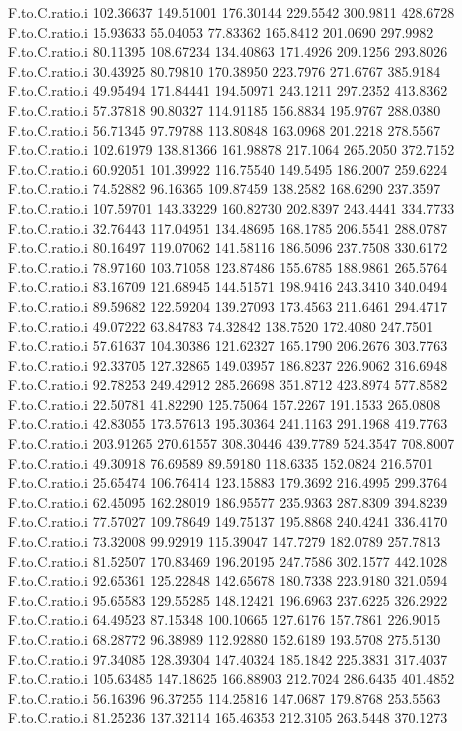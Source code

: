 \documentclass[11pt]{article} %
\begin{document}
\begin{Schunk}
\begin{Soutput}
F.to.C.ratio.i 102.36637 149.51001 176.30144 229.5542 300.9811 428.6728
F.to.C.ratio.i  15.93633  55.04053  77.83362 165.8412 201.0690 297.9982
F.to.C.ratio.i  80.11395 108.67234 134.40863 171.4926 209.1256 293.8026
F.to.C.ratio.i  30.43925  80.79810 170.38950 223.7976 271.6767 385.9184
F.to.C.ratio.i  49.95494 171.84441 194.50971 243.1211 297.2352 413.8362
F.to.C.ratio.i  57.37818  90.80327 114.91185 156.8834 195.9767 288.0380
F.to.C.ratio.i  56.71345  97.79788 113.80848 163.0968 201.2218 278.5567
F.to.C.ratio.i 102.61979 138.81366 161.98878 217.1064 265.2050 372.7152
F.to.C.ratio.i  60.92051 101.39922 116.75540 149.5495 186.2007 259.6224
F.to.C.ratio.i  74.52882  96.16365 109.87459 138.2582 168.6290 237.3597
F.to.C.ratio.i 107.59701 143.33229 160.82730 202.8397 243.4441 334.7733
F.to.C.ratio.i  32.76443 117.04951 134.48695 168.1785 206.5541 288.0787
F.to.C.ratio.i  80.16497 119.07062 141.58116 186.5096 237.7508 330.6172
F.to.C.ratio.i  78.97160 103.71058 123.87486 155.6785 188.9861 265.5764
F.to.C.ratio.i  83.16709 121.68945 144.51571 198.9416 243.3410 340.0494
F.to.C.ratio.i  89.59682 122.59204 139.27093 173.4563 211.6461 294.4717
F.to.C.ratio.i  49.07222  63.84783  74.32842 138.7520 172.4080 247.7501
F.to.C.ratio.i  57.61637 104.30386 121.62327 165.1790 206.2676 303.7763
F.to.C.ratio.i  92.33705 127.32865 149.03957 186.8237 226.9062 316.6948
F.to.C.ratio.i  92.78253 249.42912 285.26698 351.8712 423.8974 577.8582
F.to.C.ratio.i  22.50781  41.82290 125.75064 157.2267 191.1533 265.0808
F.to.C.ratio.i  42.83055 173.57613 195.30364 241.1163 291.1968 419.7763
F.to.C.ratio.i 203.91265 270.61557 308.30446 439.7789 524.3547 708.8007
F.to.C.ratio.i  49.30918  76.69589  89.59180 118.6335 152.0824 216.5701
F.to.C.ratio.i  25.65474 106.76414 123.15883 179.3692 216.4995 299.3764
F.to.C.ratio.i  62.45095 162.28019 186.95577 235.9363 287.8309 394.8239
F.to.C.ratio.i  77.57027 109.78649 149.75137 195.8868 240.4241 336.4170
F.to.C.ratio.i  73.32008  99.92919 115.39047 147.7279 182.0789 257.7813
F.to.C.ratio.i  81.52507 170.83469 196.20195 247.7586 302.1577 442.1028
F.to.C.ratio.i  92.65361 125.22848 142.65678 180.7338 223.9180 321.0594
F.to.C.ratio.i  95.65583 129.55285 148.12421 196.6963 237.6225 326.2922
F.to.C.ratio.i  64.49523  87.15348 100.10665 127.6176 157.7861 226.9015
F.to.C.ratio.i  68.28772  96.38989 112.92880 152.6189 193.5708 275.5130
F.to.C.ratio.i  97.34085 128.39304 147.40324 185.1842 225.3831 317.4037
F.to.C.ratio.i 105.63485 147.18625 166.88903 212.7024 286.6435 401.4852
F.to.C.ratio.i  56.16396  96.37255 114.25816 147.0687 179.8768 253.5563
F.to.C.ratio.i  81.25236 137.32114 165.46353 212.3105 263.5448 370.1273

\end{Soutput}
\end{Schunk}
\end{document}
